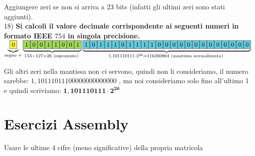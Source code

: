 \documentclass[a4paper, 12pt]{article} %
\begin{document}
\textsf{\small \color{red} Aggiungere zeri se non si arriva a 23 bits (infatti gli ultimi zeri sono stati aggiunti).} \\


\textsf{\large{\color{red} 18) \textbf{\normalcolor Si calcoli il valore decimale corrispondente ai seguenti numeri in formato IEEE $ 754 $ in singola precisione.}}} \\

$\underbrace{\fcolorbox{black}{yellow!75}{0}} _{\text{segno } +}
	\underbrace{\fcolorbox{black}{LimeGreen!75}{1} \fcolorbox{black}{LimeGreen!75}{0} \fcolorbox{black}{LimeGreen!75}{0} \fcolorbox{black}{LimeGreen!75}{1} \fcolorbox{black}{LimeGreen!75}{1} \fcolorbox{black}{LimeGreen!75}{0}
	\fcolorbox{black}{LimeGreen!75}{0} \fcolorbox{black}{LimeGreen!75}{1}} _{153 - 127 = 26 \text{ (esponente) }}
	\underbrace{\fcolorbox{black}{SkyBlue}{1} \fcolorbox{black}{SkyBlue}{0}
	\fcolorbox{black}{SkyBlue}{1} \fcolorbox{black}{SkyBlue}{1}
	\fcolorbox{black}{SkyBlue}{1} \fcolorbox{black}{SkyBlue}{0}
	\fcolorbox{black}{SkyBlue}{1} \fcolorbox{black}{SkyBlue}{1}
	\fcolorbox{black}{SkyBlue}{1} \fcolorbox{black}{SkyBlue}{1}
	\fcolorbox{black}{SkyBlue}{0} \fcolorbox{black}{SkyBlue}{0}
	\fcolorbox{black}{SkyBlue}{0} \fcolorbox{black}{SkyBlue}{0}
	\fcolorbox{black}{SkyBlue}{0} \fcolorbox{black}{SkyBlue}{0}
	\fcolorbox{black}{SkyBlue}{0} \fcolorbox{black}{SkyBlue}{0}
	\fcolorbox{black}{SkyBlue}{0} \fcolorbox{black}{SkyBlue}{0}
	\fcolorbox{black}{SkyBlue}{0} \fcolorbox{black}{SkyBlue}{0}
	\fcolorbox{black}{SkyBlue}{0}} _{1,101110111 \cdot 2^{26} = 116260864 \text{ (mantissa normalizzata) }}$ \quad

\textsf{{\small Gli altri zeri nella mantissa non ci servono, quindi non li consideriamo, il numero sarebbe: $1,10111011100000000000000$ , ma noi consideriamo solo fino all'ultimo 1 e quindi scriviamo: $ \mathbf{1,101110111 \cdot 2^{26}} $}} \\


\newpage

\section{Esercizi Assembly}

\textsf{{\normalsize Usare le ultime 4 cifre (meno significative) della propria matricola}} \\
\end{document}
